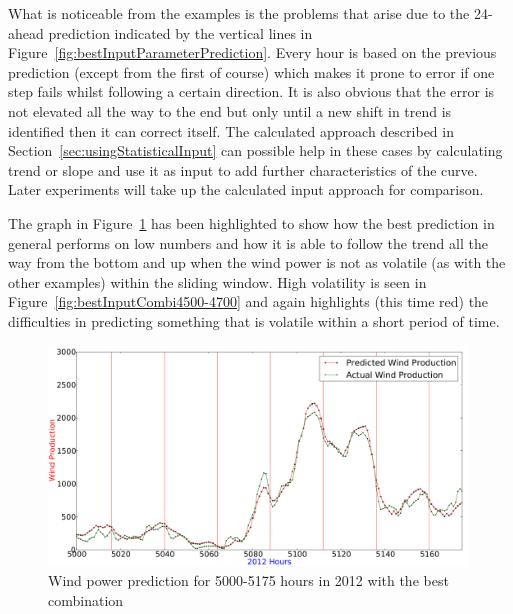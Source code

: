 What is noticeable from the examples is the problems that arise due to the 24-ahead prediction indicated by the vertical lines in Figure~\ref{fig:bestInputParameterPrediction}. Every hour is based on the previous prediction (except from the first of course) which makes it prone to error if one step fails whilst following a certain direction. It is also obvious that the error is not elevated all the way to the end but only until a new shift in trend is identified then it can correct itself. The calculated approach described in Section~\ref{sec:usingStatisticalInput} can possible help in these cases by calculating trend or slope and use it as input to add further characteristics of the curve. Later experiments will take up the calculated input approach for comparison.

The graph in Figure~\ref{fig:bestInputParameterLowNumbers} has been highlighted to show how the best prediction in general performs on low numbers and how it is able to follow the trend all the way from the bottom and up when the wind power is not as volatile (as with the other examples) within the sliding window. High volatility is seen in Figure~\ref{fig:bestInputCombi4500-4700} and again highlights (this time red) the difficulties in predicting something that is volatile within a short period of time.

\begin{figure}[ht!]
\centering
\includegraphics[width=0.99\textwidth]{billeder/bestInputParameterLowNumbers.png}
\caption{Wind power prediction for 5000-5175 hours in 2012 with the best combination}
\label{fig:bestInputParameterLowNumbers}
\end{figure} 

